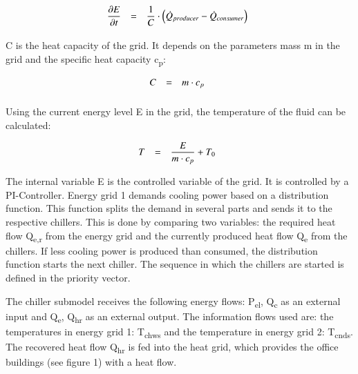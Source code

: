 \documentclass[3p,times,procedia,twocolumn,twoside]{elsarticle}
\begin{document}
\begin{equation}
\begin{array}{@{}lcl}

\displaystyle 
\frac{\partial E}{\partial t} &=& 
\displaystyle 
\frac
{1}
{C}
\cdot \left
(\dot{Q}_{producer} - \dot{Q}_{consumer}\right)
\\[6pt]

\end{array}\vspace*{-12pt}
\end{equation}

C is the heat capacity of the grid. It depends on the parameters mass m in the grid and the specific heat capacity c\textsubscript{p}:

\begin{equation}
\begin{array}{@{}lcl}

\displaystyle 
C &=& 
\displaystyle 
m \cdot c_p
\\[6pt]

\end{array}\vspace*{-12pt}
\end{equation}

Using the current energy level E in the grid, the temperature of the fluid can be calculated:

\begin{equation}
\begin{array}{@{}lcl}

\displaystyle 
T &=& 
\displaystyle 
\frac{E}
{m \cdot c_p}
+ T_0
\\[6pt]

\end{array}\vspace*{-12pt}
\end{equation}

The internal variable E is the controlled variable of the grid. It is controlled by a PI-Controller. Energy grid 1 demands cooling power based on a distribution function. This function splits the demand in several parts and sends it to the respective chillers. This is done by comparing two variables: the required heat flow Q\textsubscript{e,r} from the energy grid and the currently produced heat flow Q\textsubscript{e} from the chillers. If less cooling power is produced than consumed, the distribution function starts the next chiller. The sequence in which the chillers are started is defined in the priority vector. 

The chiller submodel receives the following energy flows: P\textsubscript{el}, Q\textsubscript{c} as an external input and Q\textsubscript{e}, Q\textsubscript{hr} as an external output. The information flows used are: the temperatures in energy grid 1: T\textsubscript{chws} and the temperature in energy grid 2: T\textsubscript{cnds}. The recovered heat flow Q\textsubscript{hr} is fed into the heat grid, which provides the office buildings (see figure 1) with a heat flow.
\end{document}
